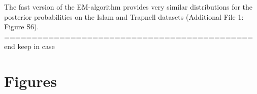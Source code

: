 \documentclass{bmcart}
\begin{document}
\begin{backmatter}
The fast version of the EM-algorithm provides very similar distributions for the posterior probabilities on the Islam and Trapnell datasets (Additional File 1: Figure S6).\\

============================================= end keep in case








\section*{Figures}


\end{backmatter}
\end{document}
